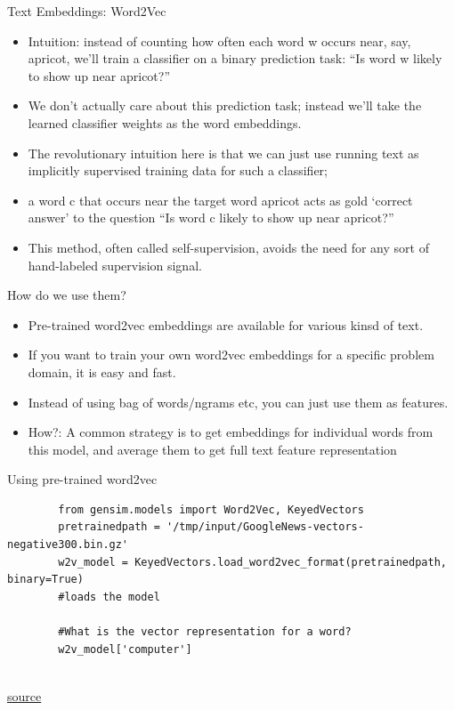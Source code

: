 \documentclass{beamer}
\begin{document}
\begin{frame}{Text Embeddings: Word2Vec} 
\begin{itemize}
    \item Intuition: instead of counting how often each word w occurs near, say, apricot, we’ll train a classifier on a binary prediction task: “Is word w likely to show up near apricot?”  \pause
    \item We don’t actually care about this prediction task; instead we’ll take the learned classifier weights as the word embeddings. \pause
    \item The revolutionary intuition here is that we can just use running text as implicitly
supervised training data for such a classifier;
\item a word c that occurs near the target word apricot acts as gold ‘correct answer’ to the question “Is word c likely to show up near apricot?” 
\item This method, often called self-supervision, avoids the need for any sort of hand-labeled supervision signal.
\end{itemize}
\end{frame}

\begin{frame}{How do we use them?}
\begin{itemize}
    \item Pre-trained word2vec embeddings are available for various kinsd of text.
    \item If you want to train your own word2vec embeddings for a specific problem domain, it is easy and fast.
    \item Instead of using bag of words/ngrams etc, you can just use them as features.
    \item How?: A common strategy is to get embeddings for individual words from this model, and average them to get full text feature representation
\end{itemize}
\end{frame}

\begin{frame}[fragile]{Using pre-trained word2vec}
\tiny
    \begin{verbatim}
        from gensim.models import Word2Vec, KeyedVectors
        pretrainedpath = '/tmp/input/GoogleNews-vectors-negative300.bin.gz'
        w2v_model = KeyedVectors.load_word2vec_format(pretrainedpath, binary=True) 
        #loads the model
    
        #What is the vector representation for a word? 
        w2v_model['computer']
    \end{verbatim}
    \\ \href{https://github.com/practical-nlp/practical-nlp/blob/master/Ch3/05_Pre_Trained_Word_Embeddings.ipynb}{source}

\end{frame}
\end{document}
